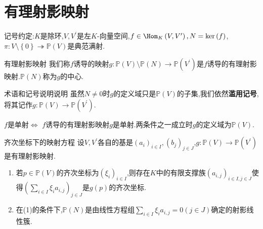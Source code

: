 \section{有理射影映射}

记号约定:$K$是除环,$V,V^{\prime}$是左$K$-向量空间,$f\in\Hom_{K}\left(V,V^{\prime}\right),N=\ker\left(f\right)$,$\pi:V\setminus\left\{0\right\}\twoheadrightarrow\mathbb{P}\left(V\right)$是典范满射.

\begin{definition}{有理射影映射}{}
	我们称$f$诱导的映射$g:\mathbb{P}\left(V\right)\setminus\mathbb{P}\left(N\right)\to\mathbb{P}\left(V^{\prime}\right)$是$f$诱导的有理射影映射.$\mathbb{P}\left(N\right)$称为$g$的中心.
\end{definition}

\begin{remark}{术语和记号说明说明}{}
	虽然$N\neq 0$时$g$的定义域只是$\mathbb{P}\left(V\right)$的子集,我们依然\textbf{滥用记号},将其记作$g:\mathbb{P}\left(V\right)\to\mathbb{P}\left(V^{\prime}\right)$.
\end{remark}

\begin{proposition}{}{}
	$f$是单射$\iff$ $f$诱导的有理射影映射$g$是单射.两条件之一成立时$g$的定义域为$\mathbb{P}\left(V\right)$.
\end{proposition}

\begin{proposition}{齐次坐标下的映射方程}{}
	设$V,V^{\prime}$各自的基是$\left(a_{i}\right)_{i\in I},\left(b_{j}\right)_{j\in J}$,$g:\mathbb{P}\left(V\right)\to\mathbb{P}\left(V^{\prime}\right)$是有理射影映射.
	\begin{enumerate}
		\item 若$p\in\mathbb{P}\left(V\right)$的齐次坐标为$\left(\xi_{i}\right)_{i\in I}$,则存在$K$中的有限支撑族$\left(a_{i,j}\right)_{i\in I,j\in J}$使得$\left(\sum\limits_{i\in I}\xi_{i}a_{i,j}\right)_{j\in J}$是$g\left(p\right)$的齐次坐标.
		\item 在(1)的条件下,$\mathbb{P}\left(N\right)$是由线性方程组$\sum\limits_{i\in I}\xi_{i}a_{i,j}=0\left(j\in J\right)$确定的射影线性簇.
	\end{enumerate}
\end{proposition}

